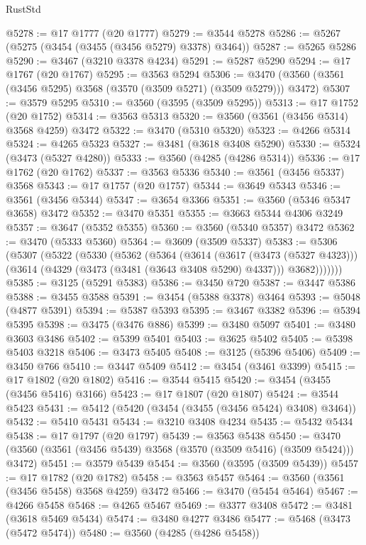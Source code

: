 \begin{lexlean}{RustStd}
\begin{coremodule}
@5278 := @17 @1777 (@20 @1777)
@5279 := @3544 @5278
@5286 := @5267 (@5275 (@3454 (@3455 (@3456 @5279) @3378) @3464))
@5287 := @5265 @5286
@5290 := @3467 (@3210 @3378 @4234)
@5291 := @5287 @5290
@5294 := @17 @1767 (@20 @1767)
@5295 := @3563 @5294
@5306 := @3470 (@3560 (@3561 (@3456 @5295) @3568 (@3570 (@3509 @5271) (@3509 @5279))) @3472)
@5307 := @3579 @5295
@5310 := @3560 (@3595 (@3509 @5295))
@5313 := @17 @1752 (@20 @1752)
@5314 := @3563 @5313
@5320 := @3560 (@3561 (@3456 @5314) @3568 @4259) @3472
@5322 := @3470 (@5310 @5320)
@5323 := @4266 @5314
@5324 := @4265 @5323
@5327 := @3481 (@3618 @3408 @5290)
@5330 := @5324 (@3473 (@5327 @4280))
@5333 := @3560 (@4285 (@4286 @5314))
@5336 := @17 @1762 (@20 @1762)
@5337 := @3563 @5336
@5340 := @3561 (@3456 @5337) @3568
@5343 := @17 @1757 (@20 @1757)
@5344 := @3649 @5343
@5346 := @3561 (@3456 @5344)
@5347 := @3654 @3366
@5351 := @3560 (@5346 @5347 @3658) @3472
@5352 := @3470 @5351
@5355 := @3663 @5344 @4306 @3249
@5357 := @3647 (@5352 @5355)
@5360 := @3560 (@5340 @5357) @3472
@5362 := @3470 (@5333 @5360)
@5364 := @3609 (@3509 @5337)
@5383 := @5306
    (@5307
      (@5322
        (@5330
          (@5362
            (@5364
              (@3614
                (@3617 (@3473 (@5327 @4323)))
                (@3614 (@4329 (@3473 (@3481 (@3643 @3408 @5290) @4337))) @3682)))))))
@5385 := @3125 (@5291 @5383)
@5386 := @3450 @720
@5387 := @3447 @5386
@5388 := @3455 @3588
@5391 := @3454 (@5388 @3378) @3464
@5393 := @5048 (@4877 @5391)
@5394 := @5387 @5393
@5395 := @3467 @3382
@5396 := @5394 @5395
@5398 := @3475 (@3476 @886)
@5399 := @3480 @5097
@5401 := @3480 @3603 @3486
@5402 := @5399 @5401
@5403 := @3625 @5402
@5405 := @5398 @5403 @3218
@5406 := @3473 @5405
@5408 := @3125 (@5396 @5406)
@5409 := @3450 @766
@5410 := @3447 @5409
@5412 := @3454 (@3461 @3399)
@5415 := @17 @1802 (@20 @1802)
@5416 := @3544 @5415
@5420 := @3454 (@3455 (@3456 @5416) @3166)
@5423 := @17 @1807 (@20 @1807)
@5424 := @3544 @5423
@5431 := @5412 (@5420 (@3454 (@3455 (@3456 @5424) @3408) @3464))
@5432 := @5410 @5431
@5434 := @3210 @3408 @4234
@5435 := @5432 @5434
@5438 := @17 @1797 (@20 @1797)
@5439 := @3563 @5438
@5450 := @3470 (@3560 (@3561 (@3456 @5439) @3568 (@3570 (@3509 @5416) (@3509 @5424))) @3472)
@5451 := @3579 @5439
@5454 := @3560 (@3595 (@3509 @5439))
@5457 := @17 @1782 (@20 @1782)
@5458 := @3563 @5457
@5464 := @3560 (@3561 (@3456 @5458) @3568 @4259) @3472
@5466 := @3470 (@5454 @5464)
@5467 := @4266 @5458
@5468 := @4265 @5467
@5469 := @3377 @3408
@5472 := @3481 (@3618 @5469 @5434)
@5474 := @3480 @4277 @3486
@5477 := @5468 (@3473 (@5472 @5474))
@5480 := @3560 (@4285 (@4286 @5458))

\end{coremodule}
\end{lexlean}
